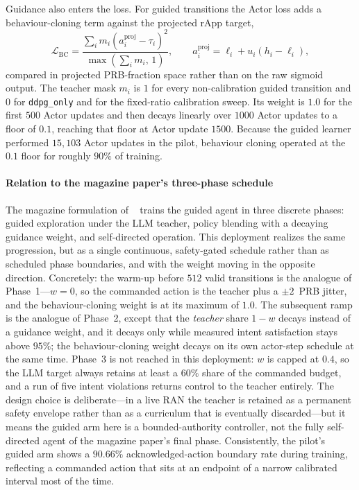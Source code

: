Guidance also enters the loss. For guided transitions the Actor loss adds a behaviour-cloning term against the projected rApp target,
\begin{equation}
\mathcal{L}_{\mathrm{BC}}=\frac{\sum_i m_i\left(a_i^{\mathrm{proj}}-\tau_i\right)^2}{\max\!\left(\sum_i m_i,\,1\right)},\qquad a_i^{\mathrm{proj}}=\ell_i+u_i(h_i-\ell_i),
\label{eq:ctl-bc}
\end{equation}
compared in projected PRB-fraction space rather than on the raw sigmoid output. The teacher mask $m_i$ is $1$ for every non-calibration guided transition and $0$ for \texttt{ddpg\_only} and for the fixed-ratio calibration sweep. Its weight is $1.0$ for the first $500$ Actor updates and then decays linearly over $1000$ Actor updates to a floor of $0.1$, reaching that floor at Actor update $1500$. Because the guided learner performed $15{,}103$ Actor updates in the pilot, behaviour cloning operated at the $0.1$ floor for roughly $90\%$ of training.

\paragraph*{Relation to the magazine paper's three-phase schedule}
The magazine formulation of \systemname~\cite{bao2026llmhric} trains the guided agent in three discrete phases: guided exploration under the LLM teacher, policy blending with a decaying guidance weight, and self-directed operation. This deployment realizes the same progression, but as a single continuous, safety-gated schedule rather than as scheduled phase boundaries, and with the weight moving in the opposite direction. Concretely: the warm-up before $512$ valid transitions is the analogue of Phase~1---$w=0$, so the commanded action is the teacher plus a $\pm2$~PRB jitter, and the behaviour-cloning weight is at its maximum of $1.0$. The subsequent ramp is the analogue of Phase~2, except that the \emph{teacher} share $1-w$ decays instead of a guidance weight, and it decays only while measured intent satisfaction stays above $95\%$; the behaviour-cloning weight decays on its own actor-step schedule at the same time. Phase~3 is not reached in this deployment: $w$ is capped at $0.4$, so the LLM target always retains at least a $60\%$ share of the commanded budget, and a run of five intent violations returns control to the teacher entirely. The design choice is deliberate---in a live RAN the teacher is retained as a permanent safety envelope rather than as a curriculum that is eventually discarded---but it means the guided arm here is a bounded-authority controller, not the fully self-directed agent of the magazine paper's final phase. Consistently, the pilot's guided arm shows a $90.66\%$ acknowledged-action boundary rate during training, reflecting a commanded action that sits at an endpoint of a narrow calibrated interval most of the time.

